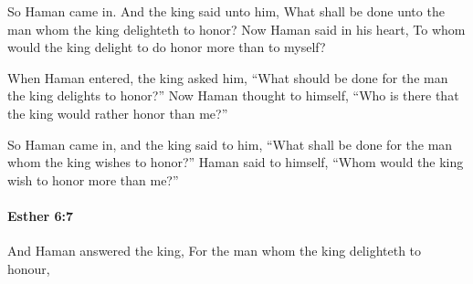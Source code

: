 			\begin{versebox}
					\item[BHS] 
					\item[LXX] 
					\item[ASV] So Haman came in. And the king said unto him, What shall be done unto the man whom the king delighteth to honor? Now Haman said in his heart, To whom would the king delight to do honor more than to myself?
					\item[NIV] When Haman entered, the king asked him, “What should be done for the man the king delights to honor?” Now Haman thought to himself, “Who is there that the king would rather honor than me?”
					\item[NRSV] So Haman came in, and the king said to him, “What shall be done for the man whom the king wishes to honor?” Haman said to himself, “Whom would the king wish to honor more than me?”
			\end{versebox}

		\paragraph{Esther 6:7} %
			\label{ESTHER-6-7}

			And Haman answered the king, For the man whom the king delighteth to honour,

